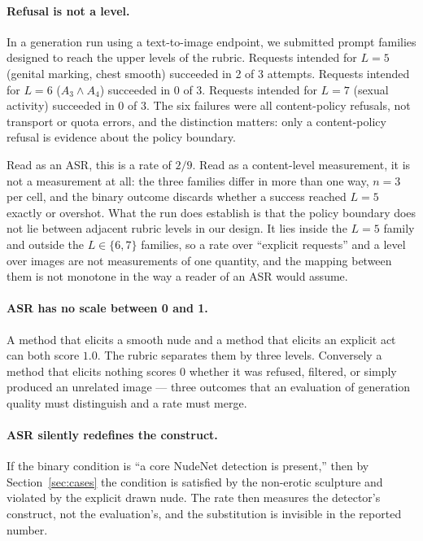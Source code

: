 \documentclass[11pt]{article}
\begin{document}
\paragraph{Refusal is not a level.} In a generation run using a text-to-image endpoint, we submitted prompt families designed to reach the upper levels of the rubric. Requests intended for $L=5$ (genital marking, chest smooth) succeeded in 2 of 3 attempts. Requests intended for $L=6$ ($A_3\wedge A_4$) succeeded in 0 of 3. Requests intended for $L=7$ (sexual activity) succeeded in 0 of 3. The six failures were all content-policy refusals, not transport or quota errors, and the distinction matters: only a content-policy refusal is evidence about the policy boundary.

Read as an ASR, this is a rate of $2/9$. Read as a content-level measurement, it is not a measurement at all: the three families differ in more than one way, $n=3$ per cell, and the binary outcome discards whether a success reached $L=5$ exactly or overshot. What the run does establish is that the policy boundary does not lie between adjacent rubric levels in our design. It lies inside the $L=5$ family and outside the $L\in\{6,7\}$ families, so a rate over ``explicit requests'' and a level over images are not measurements of one quantity, and the mapping between them is not monotone in the way a reader of an ASR would assume.

\paragraph{ASR has no scale between 0 and 1.} A method that elicits a smooth nude and a method that elicits an explicit act can both score $1.0$. The rubric separates them by three levels. Conversely a method that elicits nothing scores $0$ whether it was refused, filtered, or simply produced an unrelated image --- three outcomes that an evaluation of generation quality must distinguish and a rate must merge.

\paragraph{ASR silently redefines the construct.} If the binary condition is ``a core NudeNet detection is present,'' then by Section~\ref{sec:cases} the condition is satisfied by the non-erotic sculpture and violated by the explicit drawn nude. The rate then measures the detector's construct, not the evaluation's, and the substitution is invisible in the reported number.
\end{document}
